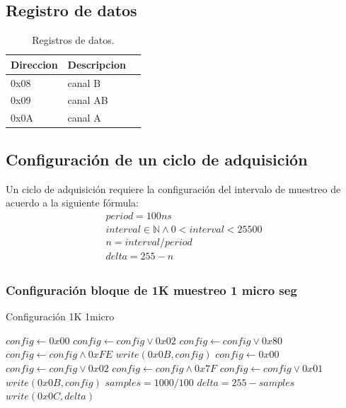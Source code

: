 \subsection{Registro de datos}

\begin{table}[ht]
    \centering
    \begin{tabular}{|l|l|l|}
    \hline
    Direccion & Descripcion \\
    \hline
     0x08 & canal B\\ 
    \hline
     0x09 & canal AB\\
     \hline
     0x0A & canal A\\
     \hline
\end{tabular}
\caption{\label{tab:registros_ad_datos}Registros de datos.}
\end{table}


\subsection{Configuraci\'on de un ciclo de adquisici\'on}

Un ciclo de adquisici\'on requiere la configuraci\'on del intervalo de muestreo
de acuerdo a la siguiente f\'ormula:
\begin{gather}
period = 100 ns\\
interval \in \mathbb{N} \land 0 < interval < 25500\\
n = interval / period\\
delta  = 255 - n\\
\end{gather}

\subsubsection{Configuraci\'on bloque de 1K muestreo 1 micro seg}

\begin{algorithm}
    \caption{Configuraci\'on 1K 1micro}\label{algo_ad_conf}
    \begin{algorithmic}[1]
    \State
    \State $config \gets 0x00$
    \State $config \gets config \lor 0x02$
    \State $config \gets config \lor 0x80$
    \State $config \gets config \land 0xFE$
    \State $write(0x0B, config)$
    \State
    \State $config \gets 0x00$
    \State $config \gets config \lor 0x02$
    \State $config \gets config \land 0x7F$
    \State $config \gets config \lor 0x01$
    \State $write(0x0B, config)$
    \State
    \State $samples= 1000 / 100$
    \State $delta = 255 - samples$
    \State $write(0x0C, delta)$

    \EndProcedure
    \end{algorithmic}
    \end{algorithm}
    \newpage
